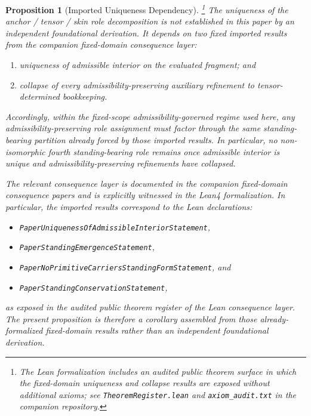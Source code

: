 \documentclass[12pt]{article}
\theoremstyle{plain}
\newtheorem{proposition}{Proposition}
\begin{document}
\begin{proposition}[Imported Uniqueness Dependency]\footnote{
The Lean formalization includes an audited public theorem surface in which the fixed-domain uniqueness and collapse results are exposed without additional axioms; see \texttt{TheoremRegister.lean} and \texttt{axiom\_audit.txt} in the companion repository.
}
The uniqueness of the anchor / tensor / skin role decomposition is not established in this paper by an independent foundational derivation. It depends on two fixed imported results from the companion fixed-domain consequence layer:
\begin{enumerate}
    \item uniqueness of admissible interior on the evaluated fragment; and
    \item collapse of every admissibility-preserving auxiliary refinement to tensor-determined bookkeeping.
\end{enumerate}
Accordingly, within the fixed-scope admissibility-governed regime used here, any admissibility-preserving role assignment must factor through the same standing-bearing partition already forced by those imported results. In particular, no non-isomorphic fourth standing-bearing role remains once admissible interior is unique and admissibility-preserving refinements have collapsed.

The relevant consequence layer is documented in the companion fixed-domain consequence papers and is explicitly witnessed in the Lean4 formalization. In particular, the imported results correspond to the Lean declarations:
\begin{itemize}
    \item \texttt{PaperUniquenessOfAdmissibleInteriorStatement},
    \item \texttt{PaperStandingEmergenceStatement},
    \item \texttt{PaperNoPrimitiveCarriersStandingFormStatement}, and
    \item \texttt{PaperStandingConservationStatement},
\end{itemize}
as exposed in the audited public theorem register of the Lean consequence layer. The present proposition is therefore a corollary assembled from those already-formalized fixed-domain results rather than an independent foundational derivation.
\end{proposition}
\end{document}
